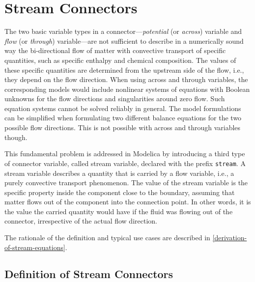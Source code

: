 \chapter{Stream Connectors}\label{stream-connectors}

The two basic variable types in a connector---\emph{potential} (or \emph{across})
variable and \emph{flow} (or \emph{through}) variable---are not sufficient to
describe in a numerically sound way the bi-directional flow of matter
with convective transport of specific quantities, such as specific
enthalpy and chemical composition. The values of these specific
quantities are determined from the upstream side of the flow, i.e., they
depend on the flow direction. When using across and through variables,
the corresponding models would include nonlinear systems of equations
with Boolean unknowns for the flow directions and singularities around
zero flow. Such equation systems cannot be solved reliably in general.
The model formulations can be simplified when formulating two different
balance equations for the two possible flow directions. This is not
possible with across and through variables though.

This fundamental problem is addressed in Modelica by introducing a third
type of connector variable, called stream variable, declared with the
prefix \lstinline!stream!. A stream variable describes a quantity that is
carried by a flow variable, i.e., a purely convective transport
phenomenon. The value of the stream variable is the specific property
inside the component close to the boundary, assuming that matter flows
out of the component into the connection point. In other words, it is
the value the carried quantity would have if the fluid was flowing out
of the connector, irrespective of the actual flow direction.

The rationale of the definition and typical use cases are described in
\cref{derivation-of-stream-equations}.

\section{Definition of Stream Connectors}\label{definition-of-stream-connectors}

